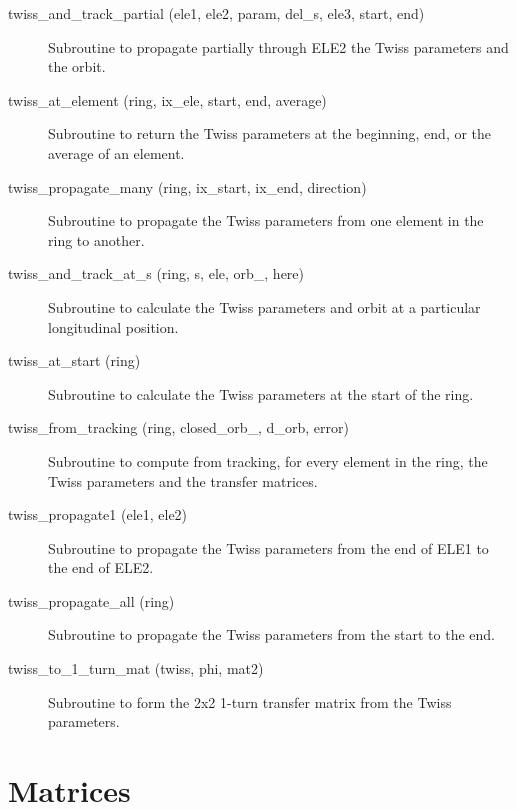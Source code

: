 \begin{description}
\item[twiss\_and\_track\_partial (ele1, ele2, param, del\_s, ele3, start, end)] \Newline
Subroutine to propagate partially through ELE2 the Twiss parameters and the orbit. 

\item[twiss\_at\_element (ring, ix\_ele, start, end, average)] \Newline
Subroutine to return the Twiss parameters at the beginning, end, or the average of an element. 

\item[twiss\_propagate\_many (ring, ix\_start, ix\_end, direction)] \Newline
Subroutine to propagate the Twiss parameters from one element in the ring to another. 

\item[twiss\_and\_track\_at\_s (ring, s, ele, orb\_, here)] \Newline
Subroutine to calculate the Twiss parameters and orbit at a particular longitudinal position. 

\item[twiss\_at\_start (ring)] \Newline
Subroutine to calculate the Twiss parameters at the start of the ring. 

\item[twiss\_from\_tracking (ring, closed\_orb\_, d\_orb, error)] \Newline
Subroutine to compute from tracking, for every element in the ring, 
the Twiss parameters and the transfer matrices. 

\item[twiss\_propagate1 (ele1, ele2)] \Newline
Subroutine to propagate the Twiss parameters from the end of ELE1 to the end of ELE2. 

\item[twiss\_propagate\_all (ring)] \Newline
Subroutine to propagate the Twiss parameters from the start to the end. 

\item[twiss\_to\_1\_turn\_mat (twiss, phi, mat2)] \Newline
Subroutine to form the 2x2 1-turn transfer matrix from the Twiss parameters. 

\end{description}

\section{Matrices}
\label{r:mat}

